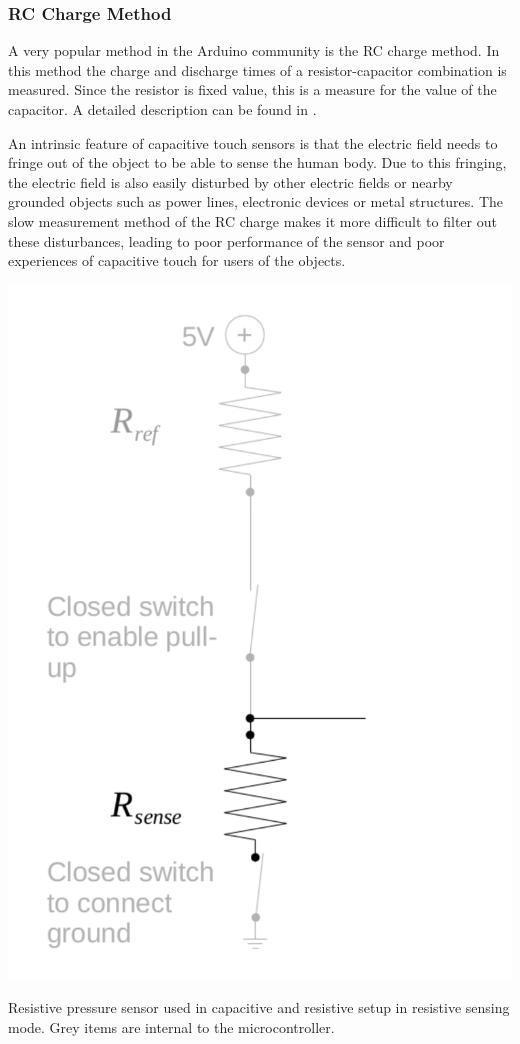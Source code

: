 \documentclass{sigchi-ext}
\begin{document}
\subsubsection{RC Charge Method}
A very popular method in the Arduino community is the RC charge
method. In this method the charge and discharge times of a resistor-capacitor
combination is measured. Since the resistor is fixed value, this is a measure
for the value of the capacitor. A detailed description can be found in
\cite{ST2009}.



An intrinsic feature of capacitive touch sensors is that the electric field needs to fringe out of the object to be able to sense the human body. Due to this fringing, the electric field is also easily disturbed by other electric fields or nearby grounded objects such as power lines, electronic devices or metal structures. The slow measurement method of the RC charge makes it more difficult to filter out these disturbances, leading to poor performance of the sensor and poor experiences of capacitive touch for users of the objects. 

\begin{marginfigure}
\begin{minipage}{\marginparwidth}
\centering
\includegraphics[width=0.75\columnwidth]{figures/cap_res_setup_res}
\caption{Resistive pressure sensor used in capacitive and resistive setup in
resistive sensing mode. Grey items are internal to the
microcontroller.}~\label{fig:cap_res_setup_res}
\end{minipage}
\end{marginfigure}
\end{document}
